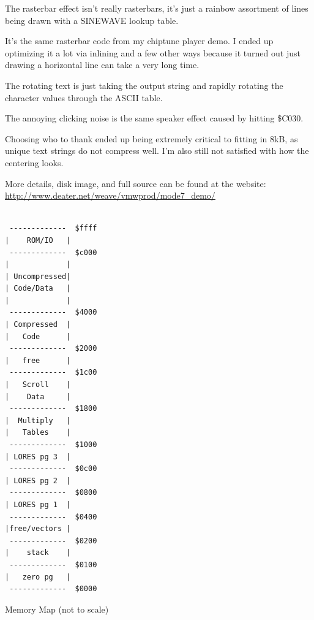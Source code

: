 \documentclass[twocolumn]{article}
\begin{document}
  The rasterbar effect isn't really rasterbars, it's just a rainbow assortment
  of lines being drawn with a SINEWAVE lookup table.

  It's the same rasterbar code from my chiptune player demo.  I ended up
  optimizing it a lot via inlining and a few other ways because it turned
  out just drawing a horizontal line can take a very long time.

  The rotating text is just taking the output string and rapidly rotating the
  character values through the ASCII table.

  The annoying clicking noise is the same speaker effect caused by hitting
  \$C030.

  Choosing who to thank ended up being extremely critical to fitting in 8kB,
  as unique text strings do not compress well.  I'm also still not satisfied
  with how the centering looks.


More details, disk image, and full source can be found at the website:
\url{http://www.deater.net/weave/vmwprod/mode7_demo/}

\begin{table}
\begin{center}
\begin{verbatim}

 -------------  $ffff
|    ROM/IO   |
 -------------  $c000
|             |
| Uncompressed|
| Code/Data   |
|             |
 -------------  $4000
| Compressed  |
|   Code      |
 -------------  $2000
|   free      |
 -------------  $1c00
|   Scroll    |
|    Data     |
 -------------  $1800
|  Multiply   |
|   Tables    |	
 -------------  $1000
| LORES pg 3  |
 -------------  $0c00
| LORES pg 2  |
 -------------  $0800
| LORES pg 1  |
 -------------  $0400
|free/vectors |
 -------------  $0200
|    stack    |
 -------------  $0100
|   zero pg   |
 -------------  $0000

\end{verbatim}
\end{center}
\caption{Memory Map (not to scale)}
\end{table}
\end{document}
